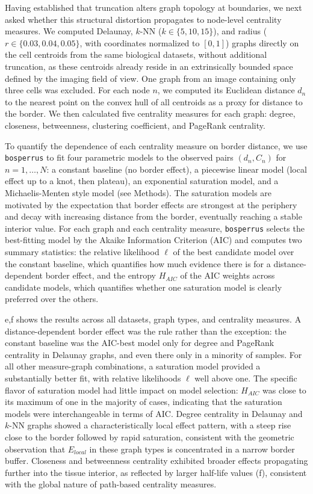 \documentclass[fleqn,10pt]{olplainarticle}
\begin{document}
Having established that truncation alters graph topology at boundaries, we next asked whether this structural distortion propagates to node-level centrality measures. We computed Delaunay, $k$-NN ($k \in \{5, 10, 15\}$), and radius ($r \in \{0.03, 0.04, 0.05\}$, with coordinates normalized to $[0,1]$) graphs directly on the cell centroids from the same biological datasets, without additional truncation, as these centroids already reside in an extrinsically bounded space defined by the imaging field of view. One graph from an image containing only three cells was excluded. For each node $n$, we computed its Euclidean distance $d_n$ to the nearest point on the convex hull of all centroids as a proxy for distance to the border. We then calculated five centrality measures for each graph: degree, closeness, betweenness, clustering coefficient, and PageRank centrality.

To quantify the dependence of each centrality measure on border distance, we use \texttt{bosperrus} to fit four parametric models to the observed pairs $(d_n, C_n)$ for $n = 1, \dots, N$: a constant baseline (no border effect), a piecewise linear model (local effect up to a knot, then plateau), an exponential saturation model, and a Michaelis-Menten style model (see Methods). The saturation models are motivated by the expectation that border effects are strongest at the periphery and decay with increasing distance from the border, eventually reaching a stable interior value. For each graph and each centrality measure, \texttt{bosperrus} selects the best-fitting model by the Akaike Information Criterion (AIC) and computes two summary statistics: the relative likelihood $\ell$ of the best candidate model over the constant baseline, which quantifies how much evidence there is for a distance-dependent border effect, and the entropy $H_{AIC}$ of the AIC weights across candidate models, which quantifies whether one saturation model is clearly preferred over the others.

e,f shows the results across all datasets, graph types, and centrality measures. A distance-dependent border effect was the rule rather than the exception: the constant baseline was the AIC-best model only for degree and PageRank centrality in Delaunay graphs, and even there only in a minority of samples. For all other measure-graph combinations, a saturation model provided a substantially better fit, with relative likelihoods $\ell$ well above one. The specific flavor of saturation model had little impact on model selection: $H_{AIC}$ was close to its maximum of one in the majority of cases, indicating that the saturation models were interchangeable in terms of AIC. Degree centrality in Delaunay and $k$-NN graphs showed a characteristically local effect pattern, with a steep rise close to the border followed by rapid saturation, consistent with the geometric observation that $E_{local}$ in these graph types is concentrated in a narrow border buffer. Closeness and betweenness centrality exhibited broader effects propagating further into the tissue interior, as reflected by larger half-life values (f), consistent with the global nature of path-based centrality measures.
\FloatBarrier
\end{document}

